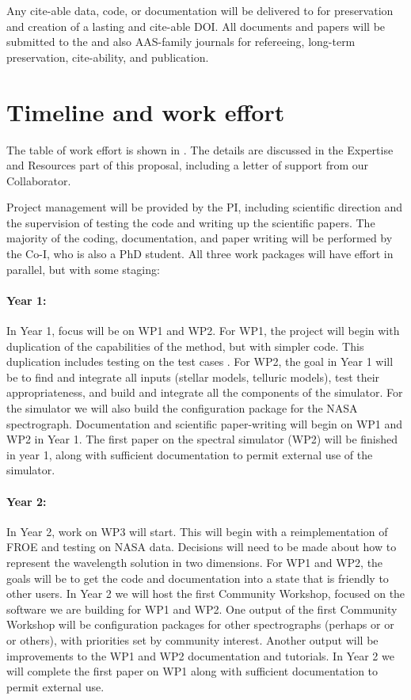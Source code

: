 \documentclass[12pt]{article}
\begin{document}
Any cite-able data, code, or documentation will be delivered to  for preservation and creation of a lasting and cite-able DOI. All documents and papers will be submitted to the  and also AAS-family journals for refereeing, long-term preservation, cite-ability, and publication.

\section*{Timeline and work effort}

The table of work effort is shown in .
The details are discussed in the Expertise and Resources part of this proposal, including a letter of support from our Collaborator.

Project management will be provided by the PI, including scientific direction and the supervision of testing the code and writing up the scientific papers.
The majority of the coding, documentation, and paper writing will be performed by the Co-I, who is also a PhD student.
All three work packages will have effort in parallel, but with some staging:

\paragraph{Year 1:}
In Year 1, focus will be on WP1 and WP2.
For WP1, the project will begin with duplication of the capabilities of the  method, but with simpler code.
This duplication includes testing on the  test cases \cite{Bedell2019}.
For WP2, the goal in Year 1 will be to find and integrate all inputs (stellar models, telluric models), test their appropriateness, and build and integrate all the components of the simulator.
For the simulator we will also build the configuration package for the NASA  spectrograph.
Documentation and scientific paper-writing will begin on WP1 and WP2 in Year 1.
The first paper on the spectral simulator (WP2) will be finished in year 1, along with sufficient documentation to permit external use of the simulator.

\paragraph{Year 2:}
In Year 2, work on WP3 will start.
This will begin with a reimplementation of FROE and testing on NASA  data.
Decisions will need to be made about how to represent the wavelength solution in two dimensions.
For WP1 and WP2, the goals will be to get the code and documentation into a state that is friendly to other users.
In Year 2 we will host the first Community Workshop, focused on the software we are building for WP1 and WP2.
One output of the first Community Workshop will be configuration packages for other spectrographs (perhaps  or  or  or others), with priorities set by community interest.
Another output will be improvements to the WP1 and WP2 documentation and tutorials.
In Year 2 we will complete the first paper on WP1 along with sufficient documentation to permit external use.
\end{document}
